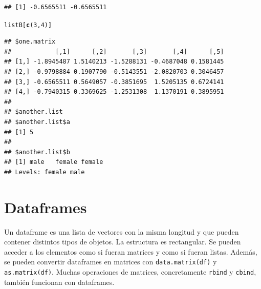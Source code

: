 \documentclass{config/apuntes}\usepackage[]{graphicx}\usepackage[]{xcolor}
\makeatletter
\newcommand{\hlnum}[1]{\textcolor[rgb]{0.686,0.059,0.569}{#1}}%
\newcommand{\hldef}[1]{\textcolor[rgb]{0.345,0.345,0.345}{#1}}%
\newcommand{\hlkwd}[1]{\textcolor[rgb]{0.737,0.353,0.396}{\textbf{#1}}}%
\newenvironment{kframe}{%
 \def\at@end@of@kframe{}%
 \ifinner\ifhmode%
  \def\at@end@of@kframe{\end{minipage}}%
  \begin{minipage}{\columnwidth}%
 \fi\fi%
 \def\FrameCommand##1{\hskip\@totalleftmargin \hskip-\fboxsep
 \colorbox{shadecolor}{##1}\hskip-\fboxsep
     \hskip-\linewidth \hskip-\@totalleftmargin \hskip\columnwidth}%
 \MakeFramed {\advance\hsize-\width
   \@totalleftmargin\z@ \linewidth\hsize
   \@setminipage}}%
 {\par\unskip\endMakeFramed%
 \at@end@of@kframe}
\newenvironment{knitrout}{}{} %
\newcommand{\code}[1]{\texttt{#1}}
\makeatother
\begin{document}
\begin{knitrout}
\begin{kframe}
\begin{alltt}
\end{alltt}
\begin{verbatim}
## [1] -0.6565511 -0.6565511
\end{verbatim}
\begin{alltt}
\hldef{listB[}\hlkwd{c}\hldef{(}\hlnum{3}\hldef{,} \hlnum{4}\hldef{)]}
\end{alltt}
\begin{verbatim}
## $one.matrix
##            [,1]      [,2]       [,3]       [,4]      [,5]
## [1,] -1.8945487 1.5140213 -1.5288131 -0.4687048 0.1581445
## [2,] -0.9798884 0.1907790 -0.5143551 -2.0820703 0.3046457
## [3,] -0.6565511 0.5649057 -0.3851695  1.5205135 0.6724141
## [4,] -0.7940315 0.3369625 -1.2531308  1.1370191 0.3895951
## 
## $another.list
## $another.list$a
## [1] 5
## 
## $another.list$b
## [1] male   female female
## Levels: female male
\end{verbatim}
\end{kframe}
\end{knitrout}

\section{Dataframes}
Un dataframe es una lista de vectores con la misma longitud y que pueden contener distintos tipos de objetos. La estructura es rectangular. Se pueden acceder a los elementos como si fueran matrices y como si fueran listas. Además, se pueden convertir dataframes en matrices con \code{data.matrix(df)} y \code{as.matrix(df)}. Muchas operaciones de matrices, concretamente \code{rbind} y \code{cbind}, también funcionan con dataframes.
\end{document}
